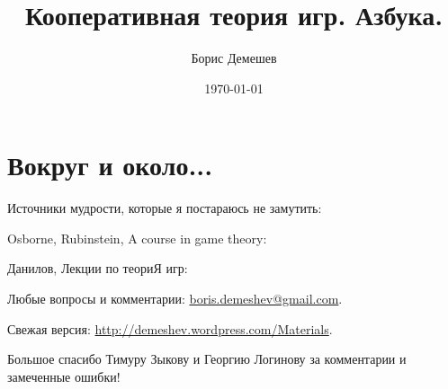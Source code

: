 \documentclass[pdftex,12pt,a4paper]{article}
\title{Кооперативная теория игр. Азбука. }
\author{Борис Демешев}
\date{\today}
\numberwithin{equation}{page} %
\theoremstyle{definition} %
\theoremstyle{definition}
\theoremstyle{definition}
\begin{document}
\maketitle
\tableofcontents{}


\section*{Вокруг и около...}


Источники мудрости, которые я постараюсь не замутить:

Osborne, Rubinstein, A course in game theory: \cite{osborne:cgt}

Данилов, Лекции по теориЯ игр: \cite{danilov:lte}

Любые вопросы и комментарии: \url{boris.demeshev@gmail.com}.

Свежая версия: \url{http://demeshev.wordpress.com/Materials}.

Большое спасибо Тимуру Зыкову и Георгию Логинову за комментарии и замеченные ошибки!

























%

\printindex %



%
\end{document}
